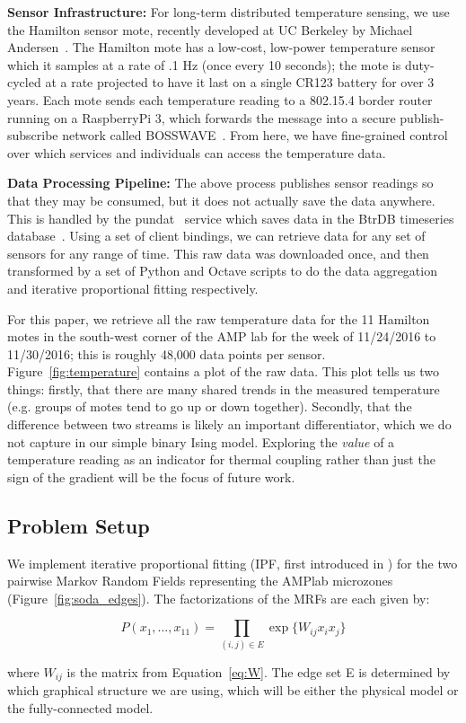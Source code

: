 \textbf{Sensor Infrastructure:} For long-term distributed temperature sensing, we use the Hamilton sensor mote, recently developed at UC Berkeley by Michael Andersen~\cite{hamiltonmote}.
The Hamilton mote has a low-cost, low-power temperature sensor which it samples at a rate of .1 Hz (once every 10 seconds); the mote is duty-cycled at a rate projected to have it last on a single CR123 battery for over 3 years.
Each mote sends each temperature reading to a 802.15.4 border router running on a RaspberryPi 3, which forwards the message into a secure publish-subscribe network called BOSSWAVE~\cite{andersen2016enabling}.
From here, we have fine-grained control over which services and individuals can access the temperature data.

\textbf{Data Processing Pipeline:} The above process publishes sensor readings so that they may be consumed, but it does not actually save the data anywhere.
This is handled by the pundat~\cite{pundat} service which saves data in the BtrDB timeseries database~\cite{andersen2016btrdb}.
Using a set of client bindings, we can retrieve data for any set of sensors for any range of time.
This raw data was downloaded once, and then transformed by a set of Python and Octave scripts to do the data aggregation and iterative proportional fitting respectively.

For this paper, we retrieve all the raw temperature data for the 11 Hamilton motes in the south-west corner of the AMP lab for the week of 11/24/2016 to 11/30/2016; this is roughly 48,000 data points per sensor.
Figure~\ref{fig:temperature} contains a plot of the raw data.
This plot tells us two things: firstly, that there are many shared trends in the measured temperature (e.g. groups of motes tend to go up or down together).
Secondly, that the difference between two streams is likely an important differentiator, which we do not capture in our simple binary Ising model.
Exploring the \emph{value} of a temperature reading as an indicator for thermal coupling rather than just the sign of the gradient will be the focus of future work.

\subsection{Problem Setup}

We implement iterative proportional fitting (IPF, first introduced in \cite{deming1940least}) for the two pairwise Markov Random Fields representing the AMPlab microzones (Figure~\ref{fig:soda_edges}).
The factorizations of the MRFs are each given by:

\begin{equation}
P(x_1,\ldots,x_{11}) = \prod_{(i,j) \in E} \exp\lbrace W_{ij}x_ix_j\rbrace 
\end{equation}

where $W_{ij}$ is the matrix from Equation~\ref{eq:W}.
The edge set E is determined by which graphical structure we are using, which will be either the physical model or the fully-connected model.
